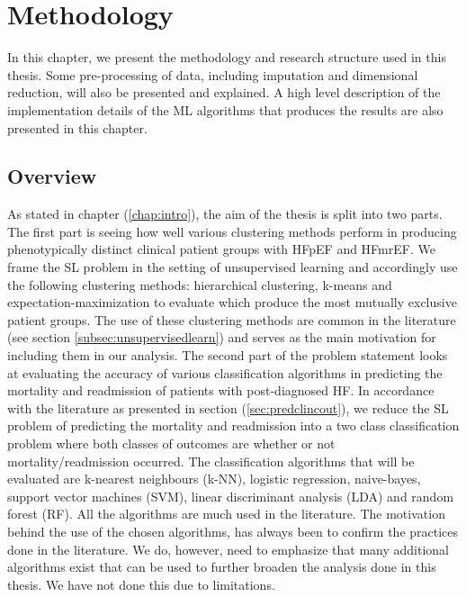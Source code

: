 \documentclass[../thesis.tex]{subfiles}
\begin{document}
\chapter{Methodology}
\label{chap:method}

\noindent In this chapter, we present the methodology and research structure used in this thesis. Some pre-processing of data, including imputation and dimensional reduction, will also be presented and explained. A high level description of the implementation details of the ML algorithms that produces the results are also presented in this chapter.

\section{Overview}
\label{sec:overview}

\noindent As stated in chapter (\ref{chap:intro}), the aim of the thesis is split into two parts. The first part is seeing how well various clustering methods perform in producing phenotypically distinct clinical patient groups with HFpEF and HFmrEF. We frame the SL problem in the setting of unsupervised learning and accordingly use the following clustering methods: hierarchical clustering, k-means and expectation-maximization to evaluate which produce the most mutually exclusive patient groups. The use of these clustering methods are common in the literature (see section \ref{subsec:unsupervisedlearn}) and serves as the main motivation for including them in our analysis. The second part of the problem statement looks at evaluating the accuracy of various classification algorithms in predicting the mortality and readmission of patients with post-diagnosed HF. In accordance with the literature as presented in section (\ref{sec:predclincout}), we reduce the SL problem of predicting the mortality and readmission into a two class classification problem where both classes of outcomes are whether or not mortality/readmission occurred. The classification algorithms that will be evaluated are k-nearest neighbours (k-NN), logistic regression, naive-bayes, support vector machines (SVM), linear discriminant analysis (LDA) and random forest (RF). All the algorithms are much used in the literature. The motivation behind the use of the chosen algorithms, has always been to confirm the practices done in the literature. We do, however, need to emphasize that many additional algorithms exist that can be used to further broaden the analysis done in this thesis. We have not done this due to limitations.
\end{document}
